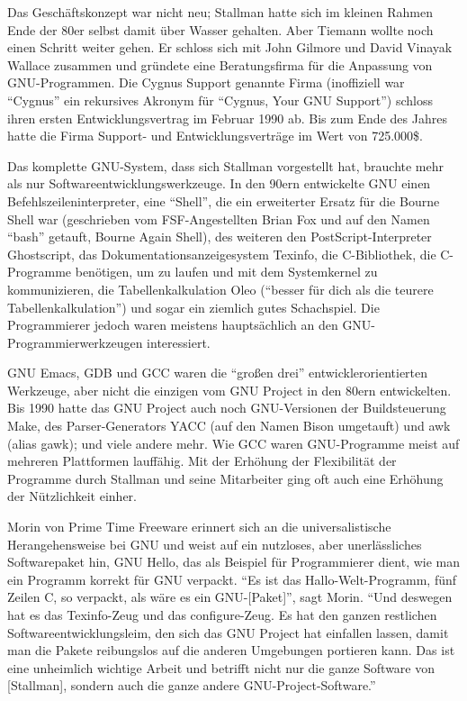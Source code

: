 Das Geschäftskonzept war nicht neu; Stallman hatte sich im kleinen Rahmen Ende der 80er selbst damit über Wasser gehalten. Aber Tiemann wollte noch einen Schritt weiter gehen.
Er schloss sich mit John Gilmore und David Vinayak Wallace zusammen und gründete eine Beratungsfirma für die Anpassung von GNU-Programmen. Die Cygnus Support genannte Firma (inoffiziell war "`Cygnus"' ein rekursives Akronym für "`Cygnus, Your GNU Support"') schloss ihren ersten Entwicklungsvertrag im Februar 1990 ab. Bis zum Ende des Jahres hatte die Firma Support- und Entwicklungsverträge im Wert von 725.000\$. 

Das komplette GNU-System, dass sich Stallman vorgestellt hat, brauchte mehr als nur Softwareentwicklungswerkzeuge. In den 90ern entwickelte GNU einen Befehlszeileninterpreter, eine "`Shell"', die ein erweiterter Ersatz für die Bourne Shell war (geschrieben vom FSF-Angestellten Brian Fox und auf den Namen "`bash"' getauft, Bourne Again Shell), des weiteren den PostScript-Interpreter Ghostscript, das Dokumentationsanzeigesystem Texinfo, die C-Bibliothek, die C-Programme benötigen, um zu laufen und mit dem Systemkernel zu kommunizieren, die Tabellenkalkulation Oleo ("`besser für dich als die teurere Tabellenkalkulation"') und sogar ein ziemlich gutes Schachspiel. Die Programmierer jedoch waren meistens hauptsächlich an den GNU-Programmierwerkzeugen interessiert.

GNU Emacs, GDB und GCC waren die "`großen drei"' entwicklerorientierten Werkzeuge, aber nicht die einzigen vom GNU Project in den 80ern entwickelten. Bis 1990 hatte das GNU Project auch noch GNU-Versionen der Buildsteuerung Make, des Parser-Generators YACC (auf den Namen Bison umgetauft) und awk (alias gawk); und viele andere mehr. Wie GCC waren GNU-Programme meist auf mehreren Plattformen lauffähig. Mit der Erhöhung der Flexibilität der Programme durch Stallman und seine Mitarbeiter ging oft auch eine Erhöhung der Nützlichkeit einher.

Morin von Prime Time Freeware erinnert sich an die universalistische Herangehensweise bei GNU und weist auf ein nutzloses, aber unerlässliches Softwarepaket hin, GNU Hello, das als Beispiel für Programmierer dient, wie man ein Programm korrekt für GNU verpackt. "`Es ist das Hallo-Welt-Programm, fünf Zeilen C, so verpackt, als wäre es ein GNU-[Paket]"', sagt Morin. "`Und deswegen hat es das Texinfo-Zeug und das configure-Zeug. Es hat den ganzen restlichen Softwareentwicklungsleim, den sich das GNU Project hat einfallen lassen, damit man die Pakete reibungslos auf die anderen Umgebungen portieren kann. Das ist eine unheimlich wichtige Arbeit und betrifft nicht nur die ganze Software von [Stallman], sondern auch die ganze andere GNU-Project-Software."'

